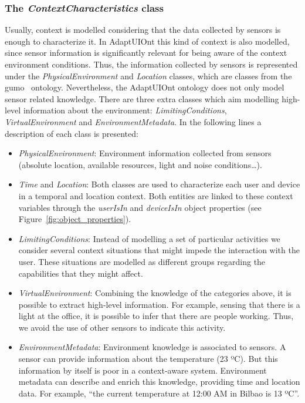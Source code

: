 

\subsubsection{The \textit{ContextCharacteristics} class}
\label{sec:context_characteristics_class}

Usually, context is modelled considering that the data collected by sensors is
enough to characterize it. In AdaptUIOnt this kind of context is also modelled,
since sensor information is significantly relevant for being aware of the context
environment conditions. Thus, the information collected by sensors is represented
under the \textit{PhysicalEnvironment} and \textit{Location} classes, which are
classes from the \ac{gumo}~\citep{heckmann_gumogeneral_2005} ontology. Nevertheless,
the AdaptUIOnt ontology does not only model sensor related knowledge. There are
three extra classes which aim modelling high-level information about the
environment: \textit{LimitingConditions}, \textit{VirtualEnvironment} and
\textit{EnvironmentMetadata}. In the following lines a description of each class
is presented:

\begin{itemize}
 \item \textit{PhysicalEnvironment}: Environment information collected from
 sensors (absolute location, available resources, light and noise conditions\dots).
 
 \item \textit{Time} and \textit{Location}: Both classes are used to characterize
 each user and device in a temporal and location context. Both entities are linked
 to these context variables through the \textit{userIsIn} and \textit{deviceIsIn}
 object properties (see Figure~\ref{fig:object_properties}).
 
 \item \textit{LimitingConditions}: Instead of modelling a set of particular
 activities we consider several context situations that might impede the interaction
 with the user. These situations are modelled as different groups regarding the
 capabilities that they might affect.
 
 \item \textit{VirtualEnvironment}: Combining the knowledge of the categories
 above, it is possible to extract high-level information. For example, sensing
 that there is a light at the office, it is possible to infer that there are
 people working. Thus, we avoid the use of other sensors to indicate this
 activity.
 
 \item \textit{EnvironmentMetadata}: Environment knowledge is associated to
 sensors. A sensor can provide information about the temperature (23 ºC). But
 this information by itself is poor in a context-aware system. Environment metadata
 can describe and enrich this knowledge, providing time and location data. For
 example, ``the current temperature at 12:00 AM in Bilbao is 13 ºC''.
\end{itemize}


